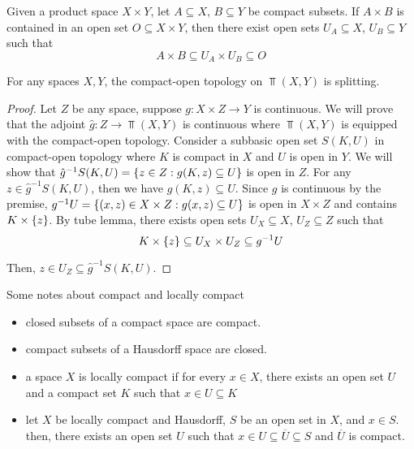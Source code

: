 \documentclass{article}
\begin{document}
\begin{lemma}
    Given a product space $X \times Y$, let $A \subseteq X$, $B \subseteq Y$ be compact subsets. If $A \times B$ is contained in an open set $O \subseteq X \times Y$, then there exist open sets $U_A \subseteq X$, $U_B \subseteq Y$ such that
    $$
        A \times B \subseteq U_A \times U_B \subseteq O
    $$
\end{lemma}

\begin{theorem}
    For any spaces $X, Y$, the compact-open topology on $\Top(X, Y )$ is splitting.
\end{theorem}

\begin{proof}
    Let $Z$ be any space, suppose $g: X \times Z \to Y$ is continuous. We will prove that the adjoint $\hat{g}: Z \to \Top(X, Y)$ is continuous where $\Top(X, Y)$ is equipped with the compact-open topology. Consider a subbasic open set $S(K, U)$ in compact-open topology where $K$ is compact in $X$ and $U$ is open in $Y$. We will show that $\hat{g}^{-1} S(K, U) = \{z \in Z: g(K, z) \subseteq U\}$ is open in $Z$. For any $z \in \hat{g}^{-1} S(K, U)$, then we have $g(K, z) \subseteq U$. Since $g$ is continuous by the premise, $g^{-1} U = \{(x, z) \in X \times Z: g(x, z) \subseteq U\}$ is open in $X \times Z$ and contains $K \times \{z\}$. By tube lemma, there exists open sets $U_X \subseteq X$, $U_Z \subseteq Z$ such that
    $$
        K \times \{z\} \subseteq U_X \times U_Z \subseteq g^{-1} U
    $$

    Then, $z \in U_Z \subseteq \hat{g}^{-1} S(K, U)$.    
\end{proof}

\begin{remark}
    Some notes about compact and locally compact
    \begin{itemize}
        \item closed subsets of a compact space are compact.
        \item compact subsets of a Hausdorff space are closed.
        \item a space $X$ is locally compact if for every $x \in X$, there exists an open set $U$ and a compact set $K$ such that $x \in U \subseteq K$
        \item let $X$ be locally compact and Hausdorff, $S$ be an open set in $X$, and $x \in S$. then, there exists an open set $U$ such that $x \in U \subseteq \overline{U} \subseteq S$ and $\overline{U}$ is compact.
    \end{itemize}
\end{remark}
\end{document}
